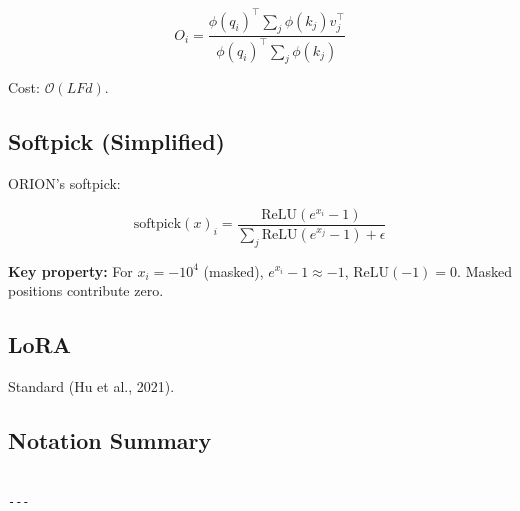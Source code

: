 \[
O_i = \frac{\phi(q_i)^\top \sum_j \phi(k_j) v_j^\top}{\phi(q_i)^\top \sum_j \phi(k_j)}
\tag{3.5}
\]

Cost: $\mathcal{O}(L F d)$.

\subsection{Softpick (Simplified)}

ORION's softpick:

\[
\text{softpick}(x)_i = \frac{\text{ReLU}(e^{x_i} - 1)}{\sum_j \text{ReLU}(e^{x_j} - 1) + \epsilon}
\tag{3.6}
\]

\textbf{Key property:} For $x_i = -10^4$ (masked), $e^{x_i} - 1 \approx -1$, 
$\text{ReLU}(-1) = 0$. Masked positions contribute zero.

\subsection{LoRA}

Standard (Hu et al., 2021).

\subsection{Notation Summary}

\begin{lstlisting}

---
\end{lstlisting}